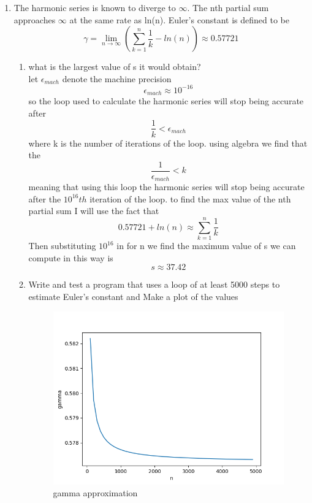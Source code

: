 \documentclass{article}
\begin{document}
\begin{enumerate}
\item The harmonic series is known to diverge to $\infty$. The nth partial sum approaches $\infty$ at the same rate as ln(n). Euler’s constant is defined to be
$$\gamma = \lim_{n \to \infty } \left( \sum_{k=1}^{n}\frac{1}{k} - ln(n) \right)\approx 0.57721$$
\begin{enumerate}
    \item what is the largest value of s it would obtain? \\let $\epsilon_{mach} $ denote the machine precision   $$\epsilon_{mach} \approx 10^{-16}$$ 
    so the loop used to calculate the harmonic series will stop being accurate after $$ \frac{1}{k} < \epsilon_{mach}$$ where k is the number of iterations of the loop. 
    using algebra we find that the $$\frac{1}{\epsilon_{mach}} < k$$ meaning that using this loop the harmonic series will stop being accurate after the $10^{16}th$ iteration of the loop. to find the max value of the nth partial sum I will use the fact that $$0.57721+ln(n)\approx \sum_{k=1}^{n}\frac{1}{k}$$ Then substituting $10^{16}$ in for n we find the maximum value of s we can compute in this way is $$s \approx 37.42$$
    \item Write and test a program that uses a loop of at least 5000 steps to estimate Euler’s constant and Make a plot of the values
    \begin{figure}[hbt!]
        \centering
        \includegraphics[width=1\linewidth]{gamma.png}
        \caption{ gamma  approximation}
        \label{fig: gamma  approximation}
    \end{figure}
    

\end{enumerate}
\end{enumerate}
\end{document}
